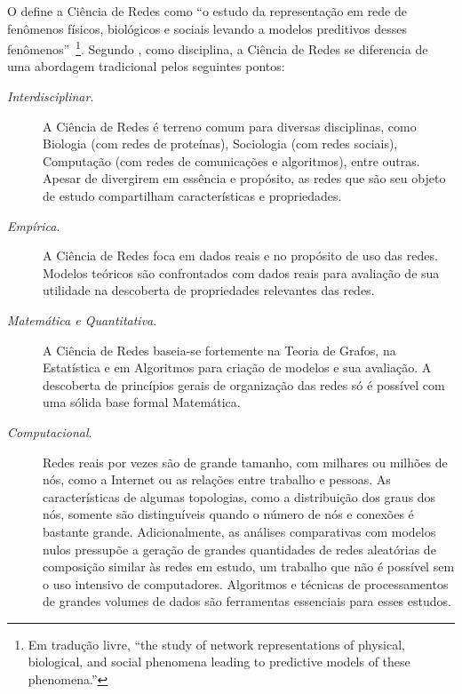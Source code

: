 \documentclass[12pt,a4paper]{article}
\theoremstyle{hypo}
\begin{document}
O  define a Ciência de Redes como \enquote{o estudo da representação em rede de fenômenos físicos, biológicos e sociais levando a modelos preditivos desses fenômenos}~\footnote{Em tradução livre, \enquote{the study of network representations of physical, biological, and social phenomena leading to predictive models of these phenomena.}}.
Segundo , como disciplina, a Ciência de Redes se diferencia de uma abordagem tradicional pelos seguintes pontos:

\begin{description}
	\item[\textit{Interdisciplinar}.] A Ciência de Redes é terreno comum para diversas disciplinas, como Biologia (com redes de proteínas), Sociologia (com redes sociais), Computação (com redes de comunicações e algoritmos), entre outras. Apesar de divergirem em essência e propósito, as redes que são seu objeto de estudo compartilham características e propriedades.
    
    \item[\textit{Empírica}.] A Ciência de Redes foca em dados reais e no propósito de uso das redes. Modelos teóricos são confrontados com dados reais para avaliação de sua utilidade na descoberta de propriedades relevantes das redes.
    
    \item[\textit{Matemática e Quantitativa}.] A Ciência de Redes baseia-se fortemente na Teoria de Grafos, na Estatística e em Algoritmos para criação de modelos e sua avaliação. A descoberta de princípios gerais de organização das redes só é possível com uma sólida base formal Matemática.
    
    \item[\textit{Computacional}.] Redes reais por vezes são de grande tamanho, com milhares ou milhões de nós, como a Internet ou as relações entre trabalho e pessoas. As características de algumas topologias, como a distribuição dos graus dos nós, somente são distinguíveis quando o número de nós e conexões é bastante grande. Adicionalmente, as análises comparativas com modelos nulos pressupõe a geração de grandes quantidades de redes aleatórias de composição similar às redes em estudo, um trabalho que não é possível sem o uso intensivo de computadores. Algoritmos e técnicas de processamentos de grandes volumes de dados são ferramentas essenciais para esses estudos.
\end{description}
\end{document}
